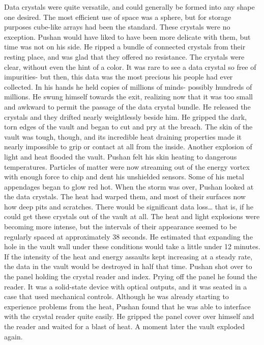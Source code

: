 \documentclass[a4paper]{article}
\begin{document}
Data crystals were quite versatile, and could generally be formed into any shape one desired. The most efficient use of space was a sphere, but for storage purposes cube-like arrays had been the standard. These crystals were no exception. Pushan would have liked to have been more delicate with them, but time was not on his side. He ripped a bundle of connected crystals from their resting place, and was glad that they offered no resistance. The crystals were clear, without even the hint of a color. It was rare to see a data crystal so free of impurities- but then, this data was the most precious his people had ever collected. In his hands he held copies of millions of minds- possibly hundreds of millions.
He swung himself towards the exit, realizing now that it was too small and awkward to permit the passage of the data crystal bundle. He released the crystals and they drifted nearly weightlessly beside him. He gripped the dark, torn edges of the vault and began to cut and pry at the breach. The skin of the vault was tough, though, and its incredible heat draining properties made it nearly impossible to grip or contact at all from the inside.
Another explosion of light and heat flooded the vault. Pushan felt his skin heating to dangerous temperatures. Particles of matter were now streaming out of the energy vortex with enough force to chip and dent his unshielded sensors. Some of his metal appendages began to glow red hot.
When the storm was over, Pushan looked at the data crystals. The heat had warped them, and most of their surfaces now how deep pits and scratches. There would be significant data loss… that is, if he could get these crystals out of the vault at all.
The heat and light explosions were becoming more intense, but the intervals of their appearance seemed to be regularly spaced at approximately 38 seconds. He estimated that expanding the hole in the vault wall under these conditions would take a little under 12 minutes. If the intensity of the heat and energy assaults kept increasing at a steady rate, the data in the vault would be destroyed in half that time.
Pushan shot over to the panel holding the crystal reader and index. Prying off the panel he found the reader. It was a solid-state device with optical outputs, and it was seated in a case that used mechanical controls. Although he was already starting to experience problems from the heat, Pushan found that he was able to interface with the crystal reader quite easily. He gripped the panel cover over himself and the reader and waited for a blast of heat. A moment later the vault exploded again.
\end{document}
